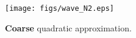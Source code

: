 \documentclass[compress]{beamer}
\begin{document}
{\begin{columns}
\begin{column}{.475\textwidth}
\begin{figure}
\begin{overlayarea}{\textwidth}{.5\textheight}
{\texttt{[image: figs/wave\_N2.eps]}
\caption*{\textbf{Coarse} quadratic approximation.}
}
\end{overlayarea}
\end{figure}
\end{column}
\end{columns}
}
\end{document}
